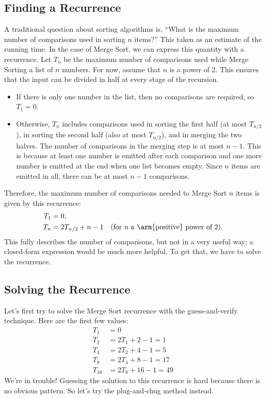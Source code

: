 \subsection{Finding a Recurrence}
A traditional question about sorting algorithms is, ``What is the
maximum number of comparisons used in sorting $n$ items?''  This taken
as an estimate of the running time.  In the case of Merge Sort, we can
express this quantity with a recurrence.  Let $T_n$ be the maximum
number of comparisons used while Merge Sorting a list of $n$ numbers.
For now, assume that $n$ is a power of 2.  This ensures that the input
can be divided in half at every stage of the recursion.
\begin{itemize}
\item If there is only one number in the list, then no comparisons are
  required, so $T_1 = 0$.
\item Otherwise, $T_n$ includes comparisons used in sorting the first
  half (at most $T_{n/2}$), in sorting the second half (also at most
  $T_{n/2}$), and in merging the two halves.  The number of
  comparisons in the merging step is at most $n - 1$.  This is because
  at least one number is emitted after each comparison and one more
  number is emitted at the end when one list becomes empty.  Since $n$
  items are emitted in all, there can be at most $n - 1$ comparisons.
\end{itemize}
Therefore, the maximum number of comparisons needed to Merge Sort $n$
items is given by this recurrence:
\begin{align*}
T_1 & = 0, \\
T_{n} & = 2 T_{n/2} + n - 1 & \text{(for $n$ a \arm{positive} power of 2)}.
\end{align*}
This fully describes the number of comparisons, but not in a very
useful way; a closed-form expression would be much more helpful.  To
get that, we have to solve the recurrence.

\subsection{Solving the Recurrence}

Let's first try to solve the Merge Sort recurrence with the
guess-and-verify technique.  Here are the first few values:
\begin{align*}
T_1 & = 0 \\
T_2 & = 2 T_1 + 2 - 1 = 1 \\
T_4 & = 2 T_2 + 4 - 1 = 5 \\
T_8 & = 2 T_4 + 8 - 1 = 17 \\
T_{16} & = 2 T_8 + 16 - 1 = 49
\end{align*}
We're in trouble!  Guessing the solution to this recurrence is hard
because there is no obvious pattern.  So let's try the plug-and-chug
method instead.

